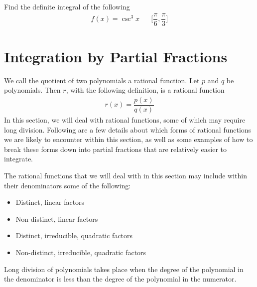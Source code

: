 \begin{exercise}
Find the definite integral of the following
\begin{align*}
    f(x) = \csc^{3} x \hspace{20pt} \Big[\dfrac{\pi}{6}, \dfrac{\pi}{3}\Big]
\end{align*}
\end{exercise}

\newpage
\section{Integration by Partial Fractions}

\begin{recall}
We call the quotient of two polynomials a rational function. Let $p$ and $q$ be polynomials. Then $r$, with the following definition, is a rational function
\begin{align*}
    r(x) = \dfrac{p(x)}{q(x)}
\end{align*}
In this section, we will deal with rational functions, some of which may require long division. Following are a few details about which forms of rational functions we are likely to encounter within this section, as well as some examples of how to break these forms down into partial fractions that are relatively easier to integrate.
\end{recall}

\begin{note}
The rational functions that we will deal with in this section may include within their denominators some of the following:
\begin{itemize}
    \item Distinct, linear factors
    \item Non-distinct, linear factors
    \item Distinct, irreducible, quadratic factors
    \item Non-distinct, irreducible, quadratic factors
\end{itemize}
\label{four_cases_for_partial_fractions}
\end{note}

\begin{recall}
Long division of polynomials takes place when the degree of the polynomial in the denominator is less than the degree of the polynomial in the numerator.
\end{recall}

